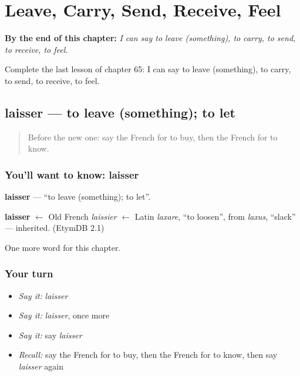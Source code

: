 
\chapter{Leave, Carry, Send, Receive, Feel}
\label{ch:fr-leave-carry-send-receive-feel}

\begin{chapteropening}
\textbf{By the end of this chapter:} \emph{I can say to leave (something), to carry, to send, to receive, to feel.}

Complete the last lesson of chapter 65: I can say to leave (something), to carry, to send, to receive, to feel.
\end{chapteropening}

\section[laisser]{laisser — to leave (something); to let}

\label{lesson:FR-C65-laisser}



\begin{quote}
Before the new one: say the French for to buy, then the French for to know.
\end{quote}

\subsection*{You'll want to know: laisser}
\textbf{laisser} — \textquotedblleft{}to leave (something); to let\textquotedblright{}.

\begin{cousinweb}
\textbf{laisser} $\leftarrow$ Old French \emph{laissier} $\leftarrow$ Latin \emph{laxare}, \textquotedblleft{}to loosen\textquotedblright{}, from \emph{laxus}, \textquotedblleft{}slack\textquotedblright{} — inherited. (EtymDB 2.1)
\end{cousinweb}

\begin{grammarlens}[title={What you've built}]
One more word for this chapter.
\end{grammarlens}

\subsection*{Your turn}
\begin{itemize}
\raggedright
  \item \emph{Say it:} \emph{laisser}
  \item \emph{Say it:} \emph{laisser}, once more
  \item \emph{Say it:} say \emph{laisser}
  \item \emph{Recall:} say the French for to buy, then the French for to know, then say \emph{laisser} again
\end{itemize}

